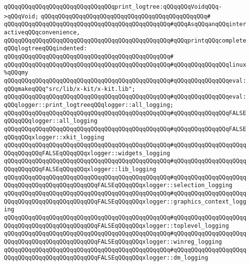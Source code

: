 \newline
\verb|qQQqqQQqqQQqqQQqqQQqqQQqqQQqqQQqprint_logtree:qQQqqQQqVoidqQQq->qQQqVoid;|\newline
\verb|qQQqqQQqqQQqqQQqqQQqqQQqqQQqqQQqqQQqqQQqqQQqqQQq#|\newline
\verb|qQQqqQQqqQQqqQQqqQQqqQQqqQQqqQQqqQQqqQQqqQQqqQQq#qQQqAsqQQqanqQQqinteractiveqQQqconvenience,|\newline
\verb|qQQqqQQqqQQqqQQqqQQqqQQqqQQqqQQqqQQqqQQqqQQqqQQq#qQQqprintqQQqcompleteqQQqlogtreeqQQqindented:|\newline
\verb|qQQqqQQqqQQqqQQqqQQqqQQqqQQqqQQqqQQqqQQqqQQqqQQq#|\newline
\verb|qQQqqQQqqQQqqQQqqQQqqQQqqQQqqQQqqQQqqQQqqQQqqQQq#qQQqqQQqqQQqqQQqlinux%qQQqmy|\newline
\verb|qQQqqQQqqQQqqQQqqQQqqQQqqQQqqQQqqQQqqQQqqQQqqQQq#qQQqqQQqqQQqqQQqeval:qQQqmakeqQQq"src/lib/x-kit/x-kit.lib";|\newline
\verb|qQQqqQQqqQQqqQQqqQQqqQQqqQQqqQQqqQQqqQQqqQQqqQQq#qQQqqQQqqQQqqQQqeval:qQQqlogger::print_logtreeqQQqlogger::all_logging;|\newline
\verb|qQQqqQQqqQQqqQQqqQQqqQQqqQQqqQQqqQQqqQQqqQQqqQQq#qQQqqQQqqQQqqQQqFALSEqQQqqQQqlogger::all_logging|\newline
\verb|qQQqqQQqqQQqqQQqqQQqqQQqqQQqqQQqqQQqqQQqqQQqqQQq#qQQqqQQqqQQqqQQqFALSEqQQqqQQqxlogger::xkit_logging|\newline
\verb|qQQqqQQqqQQqqQQqqQQqqQQqqQQqqQQqqQQqqQQqqQQqqQQq#qQQqqQQqqQQqqQQqqQQqqQQqqQQqqQQqFALSEqQQqqQQqxlogger::widgets_logging|\newline
\verb|qQQqqQQqqQQqqQQqqQQqqQQqqQQqqQQqqQQqqQQqqQQqqQQq#qQQqqQQqqQQqqQQqqQQqqQQqqQQqqQQqFALSEqQQqqQQqxlogger::lib_logging|\newline
\verb|qQQqqQQqqQQqqQQqqQQqqQQqqQQqqQQqqQQqqQQqqQQqqQQq#qQQqqQQqqQQqqQQqqQQqqQQqqQQqqQQqqQQqqQQqqQQqqQQqFALSEqQQqqQQqxlogger::selection_logging|\newline
\verb|qQQqqQQqqQQqqQQqqQQqqQQqqQQqqQQqqQQqqQQqqQQqqQQq#qQQqqQQqqQQqqQQqqQQqqQQqqQQqqQQqqQQqqQQqqQQqqQQqFALSEqQQqqQQqxlogger::graphics_context_logging|\newline
\verb|qQQqqQQqqQQqqQQqqQQqqQQqqQQqqQQqqQQqqQQqqQQqqQQq#qQQqqQQqqQQqqQQqqQQqqQQqqQQqqQQqqQQqqQQqqQQqqQQqFALSEqQQqqQQqxlogger::toplevel_logging|\newline
\verb|qQQqqQQqqQQqqQQqqQQqqQQqqQQqqQQqqQQqqQQqqQQqqQQq#qQQqqQQqqQQqqQQqqQQqqQQqqQQqqQQqqQQqqQQqqQQqqQQqFALSEqQQqqQQqxlogger::winreg_logging|\newline
\verb|qQQqqQQqqQQqqQQqqQQqqQQqqQQqqQQqqQQqqQQqqQQqqQQq#qQQqqQQqqQQqqQQqqQQqqQQqqQQqqQQqqQQqqQQqqQQqqQQqFALSEqQQqqQQqxlogger::dm_logging|\newline
